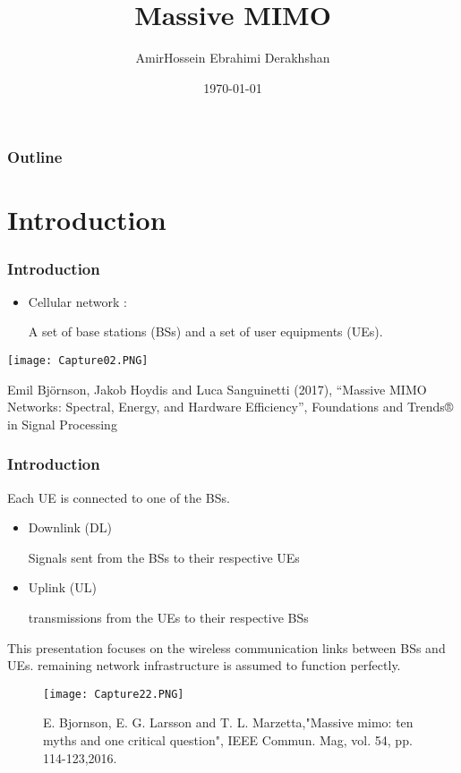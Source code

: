 \documentclass{beamer}
\title{Massive MIMO}
\author{AmirHossein Ebrahimi Derakhshan}
\institute{University of Tabriz}
\date{\today}
\begin{document}
\begin{frame}
\titlepage
\end{frame}

\begin{frame}
\frametitle{Outline}
  \tableofcontents
\end{frame}

\section{Introduction}

\begin{frame}[fragile=singleslide]\frametitle{Introduction}

\begin{itemize}
\item Cellular network :

A set of base stations (BSs) and a set of user equipments (UEs).
\end{itemize}
\begin{landscape}
\texttt{[image: Capture02.PNG]} 
\end{landscape}


\tiny Emil Björnson, Jakob Hoydis and Luca Sanguinetti (2017), “Massive MIMO Networks: Spectral, Energy, and Hardware Efficiency”, Foundations and Trends® in Signal Processing

\end{frame}







\begin{frame}[fragile=singleslide]\frametitle{Introduction}
Each UE is connected to one of the BSs.
\begin{itemize}
\item Downlink (DL)

Signals sent from the BSs to their respective UEs 
\item Uplink (UL)

transmissions from the UEs to their respective BSs
\end{itemize}
This presentation focuses on the wireless communication links between BSs and UEs. remaining network infrastructure is assumed to function perfectly.

\begin{figure}
  \texttt{[image: Capture22.PNG]}
  \caption{\tiny \tiny E. Bjornson, E. G. Larsson and T. L. Marzetta,"Massive mimo: ten myths and one critical question", IEEE Commun. Mag, vol. 54, pp. 114-123,2016.
}
\end{figure}
\end{frame}
\end{document}
